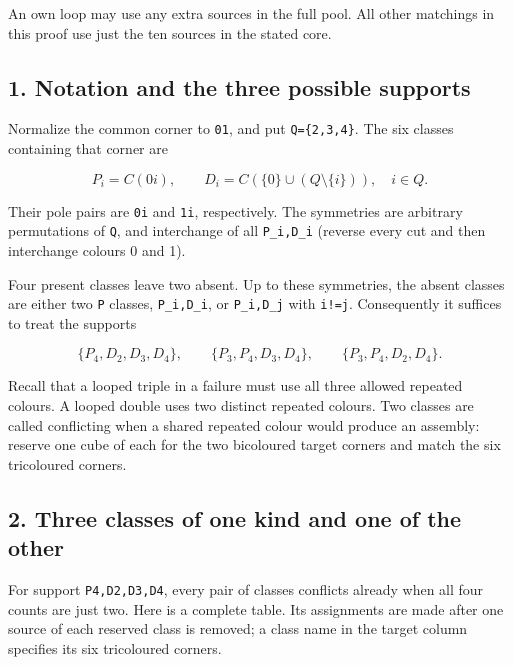 \documentclass[
  10pt,
]{article}
\begin{document}
An own loop may use any extra sources in the full pool. All other
matchings in this proof use just the ten sources in the stated core.

\hypertarget{notation-and-the-three-possible-supports}{%
\subsection*{1. Notation and the three possible
supports}\label{notation-and-the-three-possible-supports}}

Normalize the common corner to \texttt{01}, and put
\texttt{Q=\{2,3,4\}}. The six classes containing that corner are

\[
P_i=C(0i),\qquad D_i=C(\{0\}\cup(Q\setminus\{i\})),
\quad i\in Q.
\]

Their pole pairs are \texttt{0i} and \texttt{1i}, respectively. The
symmetries are arbitrary permutations of \texttt{Q}, and interchange of
all \texttt{P\_i,D\_i} (reverse every cut and then interchange colours 0
and 1).

Four present classes leave two absent. Up to these symmetries, the
absent classes are either two \texttt{P} classes, \texttt{P\_i,D\_i}, or
\texttt{P\_i,D\_j} with \texttt{i!=j}. Consequently it suffices to treat
the supports

\[
\{P_4,D_2,D_3,D_4\},\qquad
\{P_3,P_4,D_3,D_4\},\qquad
\{P_3,P_4,D_2,D_4\}.
\]

Recall that a looped triple in a failure must use all three allowed
repeated colours. A looped double uses two distinct repeated colours.
Two classes are called conflicting when a shared repeated colour would
produce an assembly: reserve one cube of each for the two bicoloured
target corners and match the six tricoloured corners.

\hypertarget{three-classes-of-one-kind-and-one-of-the-other}{%
\subsection*{2. Three classes of one kind and one of the
other}\label{three-classes-of-one-kind-and-one-of-the-other}}

For support \texttt{P4,D2,D3,D4}, every pair of classes conflicts
already when all four counts are just two. Here is a complete table. Its
assignments are made after one source of each reserved class is removed;
a class name in the target column specifies its six tricoloured corners.
\end{document}
